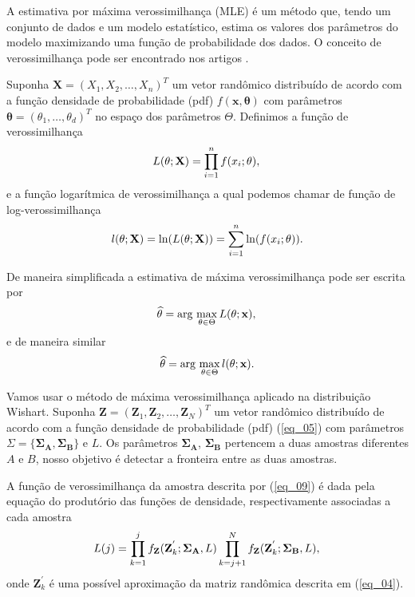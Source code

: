 \documentclass[conference]{IEEEtran}
\begin{document}
 A estimativa por máxima verossimilhança (MLE) é um método que, tendo um conjunto de dados e um modelo estatístico, estima os valores dos parâmetros do modelo maximizando uma função de probabilidade dos dados. O conceito de verossimilhança pode ser encontrado nos artigos \cite{nhfc, gmbf}.

Suponha $\mathbf{X}=(X_1,X_2,\dots,X_n)^T$ um vetor randômico distribuído de acordo com a função densidade de probabilidade (pdf) $f(\mathbf{x},\mathbf{\theta})$ com parâmetros $\mathbf{\theta}=(\theta_1,\dots,\theta_d)^T$ no espaço dos parâmetros $\Theta$. Definimos  a função de verossimilhança
\begin{equation*}
    L(\theta;\mathbf{X}) = \prod_{i=1}^{n}f(x_i;\theta), \\
\end{equation*}
e a função logarítmica de verossimilhança a qual podemos chamar de função de log-verossimilhança
\begin{equation}\label{eq_09}
	l(\theta;\mathbf{X})= \ln(L(\theta;\mathbf{X})) = \sum_{i=1}^{n}\ln(f(x_i;\theta)). \\
\end{equation}

De maneira simplificada a estimativa de máxima verossimilhança pode ser escrita por 
\begin{equation*}
    \widehat{\theta}= \text{arg}\,\max\limits_{\theta\in\Theta}L(\theta;\mathbf{x}),\\
\end{equation*}
e de maneira similar 
\begin{equation*}
    \widehat{\theta}= \text{arg}\,\max\limits_{\theta\in\Theta}l(\theta;\mathbf{x}).\\
\end{equation*}

Vamos usar o método de máxima verossimilhança aplicado na distribuição Wishart. Suponha $\mathbf{Z}=(\mathbf{Z}_1,\mathbf{Z}_2,\dots,\mathbf{Z}_N)^T$ um vetor randômico distribuído de acordo com a função densidade de probabilidade (pdf) (\ref{eq_05}) com parâmetros $\Sigma=\{\mathbf{\Sigma_A}, \mathbf{\Sigma_B\}}$ e $L$. Os parâmetros $\mathbf{\Sigma_A}$, $\mathbf{\Sigma_B}$ pertencem a duas amostras diferentes $A$ e $B$, nosso objetivo é detectar a fronteira entre as duas amostras.

A função de verossimilhança da amostra descrita por (\ref{eq_09}) é dada pela equação do produtório das funções de densidade, respectivamente associadas a cada amostra
\begin{equation}\label{eq_10}
	L(j)=\prod_{k=1}^{j}f_{\mathbf{Z}}(\mathbf{Z}_{k}^{'};\mathbf{\Sigma_{A}},L) \prod_{k=j+1}^{N}f_{\mathbf{Z}}(\mathbf{Z}_{k}^{'};\mathbf{\Sigma_{B}},L), \\
\end{equation}
onde $\mathbf{Z}_{k}^{'}$ é uma possível aproximação da matriz randômica descrita em (\ref{eq_04}).
\end{document}
